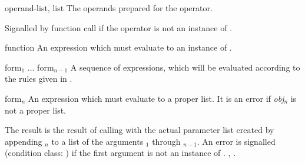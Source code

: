 \begin{optDefinition}
\begin{initoptions}
    \item[operand-list, list] The operands prepared for the operator.
\end{initoptions}
%
\remarks%
Signalled by function call if the operator is not an instance of
.

%
\Syntax
{}%
%
\begin{arguments}
    \item[function] An expression which must evaluate to an instance of
    .

    \item[form$_1$ ... form$_{n-1}$] A sequence of expressions, which will be
    evaluated according to the rules given in .

    \item[form$_n$] An expression which must evaluate to a proper list.  It is
    an error if {\em obj$_n$} is not a proper list.
\end{arguments}
%
\result%
The result is the result of calling  with the actual parameter
list created by appending $_n$ to a list of the arguments
$_1$ through $_{n-1}$.  An error is signalled (condition
class: ) if the
first argument is not an instance of .
%
\seealso%
, .
\end{optDefinition}

